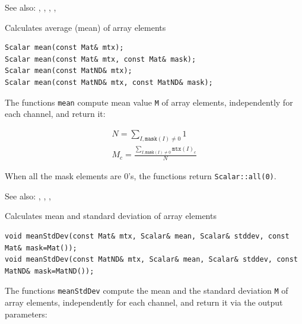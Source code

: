 See also: , , , , 

\label{mean}
Calculates average (mean) of array elements

\begin{lstlisting}
Scalar mean(const Mat& mtx);
Scalar mean(const Mat& mtx, const Mat& mask);
Scalar mean(const MatND& mtx);
Scalar mean(const MatND& mtx, const MatND& mask);
\end{lstlisting}
\begin{description}
\end{description}

The functions \texttt{mean} compute mean value \texttt{M} of array elements, independently for each channel, and return it:

\[
\begin{array}{l}
N = \sum_{I, \texttt{mask}(I) \ne 0} 1\\
M_c = \frac{\sum_{I, \texttt{mask}(I) \ne 0} \texttt{mtx}(I)_c}{N}
\end{array}
\]

When all the mask elements are 0's, the functions return \texttt{Scalar::all(0)}.

See also: , , , 

\label{meanStdDev}
Calculates mean and standard deviation of array elements

\begin{lstlisting}
void meanStdDev(const Mat& mtx, Scalar& mean, Scalar& stddev, const Mat& mask=Mat());
void meanStdDev(const MatND& mtx, Scalar& mean, Scalar& stddev, const MatND& mask=MatND());
\end{lstlisting}
\begin{description}
\end{description}

The functions \texttt{meanStdDev} compute the mean and the standard deviation \texttt{M} of array elements, independently for each channel, and return it via the output parameters:

